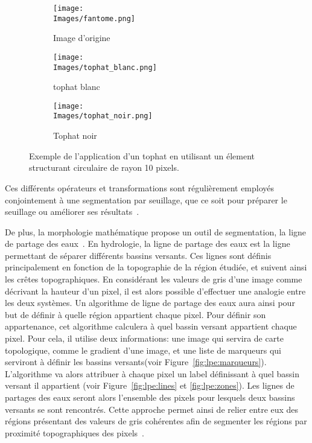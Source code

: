 \documentclass[\main/main.tex]{subfiles}
\providecommand{\Images}{\main/Figures/intro_seg}
\begin{document}
\begin{figure}[h]
    \centering
    \begin{subfigure}[b]{0.30\textwidth}
       \caption{
       Image d'origine
            }
       \centering \texttt{[image: \\Images/fantome.png]}
    \end{subfigure}
    \begin{subfigure}[b]{0.30\textwidth}
       \caption{
       \label{fig:tophat:blanc}
            tophat blanc
            }
       \centering \texttt{[image: \\Images/tophat\_blanc.png]}
    \end{subfigure}
    \begin{subfigure}[b]{0.30\textwidth}
       \caption{
           \label{fig:tophat:noir}
            Tophat noir
            }
       \centering \texttt{[image: \\Images/tophat\_noir.png]}
    \end{subfigure}
    \caption{
        Exemple de l'application d'un tophat en utilisant un élement structurant circulaire de rayon 10 pixels.
    }
    
\end{figure}
%
Ces différents opérateurs et transformations sont régulièrement employés conjointement à une segmentation par seuillage,
que ce soit pour préparer le seuillage ou améliorer ses résultats~\cite{ilhan_2019,siri_2020,liu_2019}.

%
De plus, la morphologie mathématique propose un outil de segmentation, la ligne de partage des eaux~\cite{meyer_1994}.
%
En hydrologie, la ligne de partage des eaux est la ligne permettant de séparer différents bassins versants.
%
Ces lignes sont définis principalement en fonction de la topographie de la région étudiée, et suivent ainsi les crêtes topographiques.
%
En considérant les valeurs de gris d'une image comme décrivant la hauteur d'un pixel,
il est alors possible d'effectuer une analogie entre les deux systèmes.
%
Un algorithme de ligne de partage des eaux aura ainsi pour but de définir à quelle région appartient chaque pixel.
%
Pour définir son appartenance,
cet algorithme calculera à quel bassin versant appartient chaque pixel.
%
Pour cela, il utilise deux informations: une image qui servira de carte topologique, comme le gradient d'une image, et une liste de marqueurs qui serviront à définir les bassins versants(voir Figure~\ref{fig:lpe:marqueurs}).
%
L'algorithme va alors attribuer à chaque pixel un label définissant à quel bassin versant il appartient (voir Figure~\ref{fig:lpe:lines} et \ref{fig:lpe:zones}).
%
Les lignes de partages des eaux seront alors l'ensemble des pixels pour lesquels deux bassins versants se sont rencontrés.
%
Cette approche permet ainsi de relier entre eux des régions présentant des valeurs de gris cohérentes afin de segmenter les régions par proximité topographiques des pixels~\cite{liang_2019,eschweiler_2019}.
%
\end{document}
